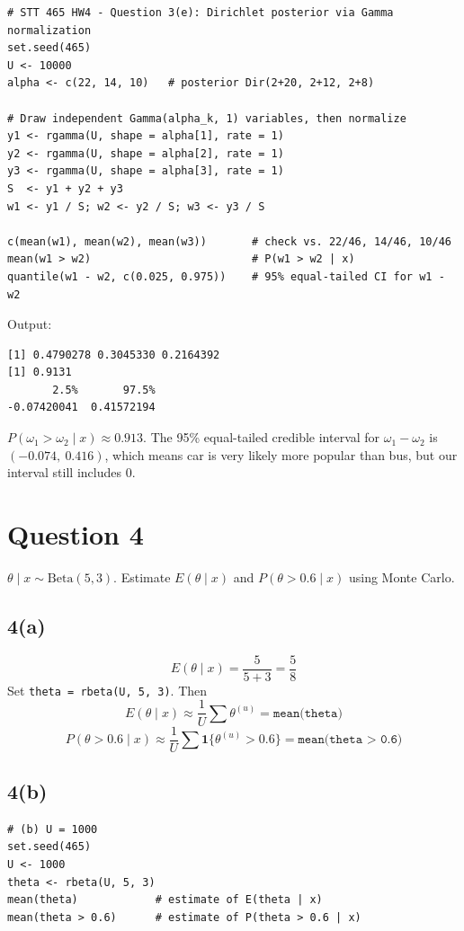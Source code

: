 \documentclass[11pt]{article}
\begin{document}
\begin{verbatim}
# STT 465 HW4 - Question 3(e): Dirichlet posterior via Gamma normalization
set.seed(465)
U <- 10000
alpha <- c(22, 14, 10)   # posterior Dir(2+20, 2+12, 2+8)

# Draw independent Gamma(alpha_k, 1) variables, then normalize
y1 <- rgamma(U, shape = alpha[1], rate = 1)
y2 <- rgamma(U, shape = alpha[2], rate = 1)
y3 <- rgamma(U, shape = alpha[3], rate = 1)
S  <- y1 + y2 + y3
w1 <- y1 / S; w2 <- y2 / S; w3 <- y3 / S

c(mean(w1), mean(w2), mean(w3))       # check vs. 22/46, 14/46, 10/46
mean(w1 > w2)                         # P(w1 > w2 | x)
quantile(w1 - w2, c(0.025, 0.975))    # 95% equal-tailed CI for w1 - w2
\end{verbatim}
Output:
\begin{verbatim}
[1] 0.4790278 0.3045330 0.2164392
[1] 0.9131
       2.5%       97.5%
-0.07420041  0.41572194
\end{verbatim}


$P(\omega_1 > \omega_2\mid x) \approx 0.913$. The 95\% equal-tailed credible interval for $\omega_1-\omega_2$ is $(-0.074,\ 0.416)$, which means car is very likely more popular than bus, but our interval still includes 0.

\section*{Question 4}

$\theta\mid x \sim \text{Beta}(5,3)$. Estimate $E(\theta\mid x)$ and $P(\theta > 0.6\mid x)$ using Monte Carlo.

\subsection*{4(a)}
\[
E(\theta\mid x) = \frac{5}{5+3} = \frac{5}{8}
\]
Set \texttt{theta = rbeta(U, 5, 3)}. Then
\[
E(\theta\mid x) \approx \frac{1}{U}\sum \theta^{(u)} = \texttt{mean(theta)}
\]
\[
P(\theta > 0.6\mid x) \approx \frac{1}{U}\sum \mathbf{1}\{\theta^{(u)} > 0.6\} = \texttt{mean(theta > 0.6)}
\]

\subsection*{4(b)}

\begin{verbatim}
# (b) U = 1000
set.seed(465)
U <- 1000
theta <- rbeta(U, 5, 3)
mean(theta)            # estimate of E(theta | x)
mean(theta > 0.6)      # estimate of P(theta > 0.6 | x)
\end{verbatim}
\end{document}
